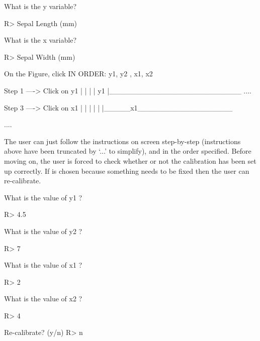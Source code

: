 \documentclass[article]{jss}
\begin{document}
\begin{CodeChunk}
\begin{CodeOutput}
What is the y variable? 
\end{CodeOutput}
\begin{CodeInput}
R> Sepal Length (mm)
\end{CodeInput}

\begin{CodeOutput}
What is the x variable? 
\end{CodeOutput}
\begin{CodeInput}
R> Sepal Width (mm)
\end{CodeInput}

\begin{CodeOutput}
On the Figure, click IN ORDER: 
      y1, y2 , x1, x2  


    Step 1 ----> Click on y1
  |
  |
  |
  |
  y1
  |_________________________
  ....

    Step 3 ----> Click on x1
  |
  |
  |
  |
  |
  |_____x1__________________

  ....
\end{CodeOutput}
\end{CodeChunk}

The user can just follow the instructions on screen step-by-step (instructions above have been truncated by `...' to simplify), and in the order specified. Before moving on, the user is forced to check whether or not the calibration has been set up correctly. If  is chosen because something needs to be fixed then the user can re-calibrate.

\begin{CodeChunk}
\begin{CodeOutput}
What is the value of y1 ?
\end{CodeOutput}
\begin{CodeInput}
R> 4.5
\end{CodeInput}
\begin{CodeOutput}
What is the value of y2 ?
\end{CodeOutput}
\begin{CodeInput}
R> 7
\end{CodeInput}
\begin{CodeOutput}
What is the value of x1 ?
\end{CodeOutput}
\begin{CodeInput}
R> 2
\end{CodeInput}
\begin{CodeOutput}
What is the value of x2 ?
\end{CodeOutput}
\begin{CodeInput}
R> 4
\end{CodeInput}
\begin{CodeOutput}
Re-calibrate? (y/n) 
R> n
\end{CodeOutput}
\end{CodeChunk}
\end{document}
